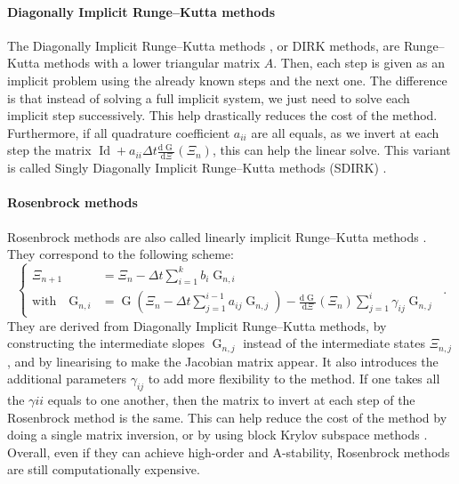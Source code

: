         \paragraph{Diagonally Implicit Runge--Kutta methods}
        The Diagonally Implicit Runge--Kutta methods \cite{Alexander1977}, or DIRK methods, are Runge--Kutta methods with a lower triangular matrix $A$.
        Then, each step is given as an implicit problem using the already known steps and the next one.
        The difference is that instead of solving a full implicit system, we just need to solve each implicit step successively.
        This help drastically reduces the cost of the method.
        Furthermore, if all quadrature coefficient $a_{ii}$ are all equals, as we invert at each step the matrix $\operatorname{Id} + a_{ii} \Delta t \frac{\mathrm{d} \operatorname{G}}{\mathrm{d} \Xi}\left(\Xi_n\right)$, this can help the linear solve.
        This variant is called Singly Diagonally Implicit Runge--Kutta methods (SDIRK) \cite{HairerWanner1996}.

        \paragraph{Rosenbrock methods}
        Rosenbrock methods are also called linearly implicit Runge--Kutta methods \cite{Rosenbrock1963}.
        They correspond to the following scheme:
        \begin{equation}
          \left\{\begin{aligned}
            \Xi_{n+1} &= \Xi_n - \Delta t \sum_{i = 1}^k b_i \operatorname{G}_{n,i} \\
            \textrm{with}\quad \operatorname{G}_{n,i} &= \operatorname{G}\left(\Xi_n - \Delta t \sum_{j = 1}^{i-1} a_{ij} \operatorname{G}_{n,j}\right) - \frac{\mathrm{d} \operatorname{G}}{\mathrm{d} \Xi}\left(\Xi_n\right) \sum_{j = 1}^{i} \gamma_{ij} \operatorname{G}_{n,j}
          \end{aligned}\right. \ .
        \end{equation}
        They are derived from Diagonally Implicit Runge--Kutta methods, by constructing the intermediate slopes $\operatorname{G}_{n,j}$ instead of the intermediate states $\Xi_{n,j}$, and by linearising to make the Jacobian matrix appear.
        It also introduces the additional parameters $\gamma_{ij}$ to add more flexibility to the method.
        If one takes all the $\gamma{ii}$ equals to one another, then the matrix to invert at each step of the Rosenbrock method is the same.
        This can help reduce the cost of the method by doing a single matrix inversion, or by using block Krylov subspace methods \cite{Gutknecht2006}.
        Overall, even if they can achieve high-order and A-stability, Rosenbrock methods are still computationally expensive.


